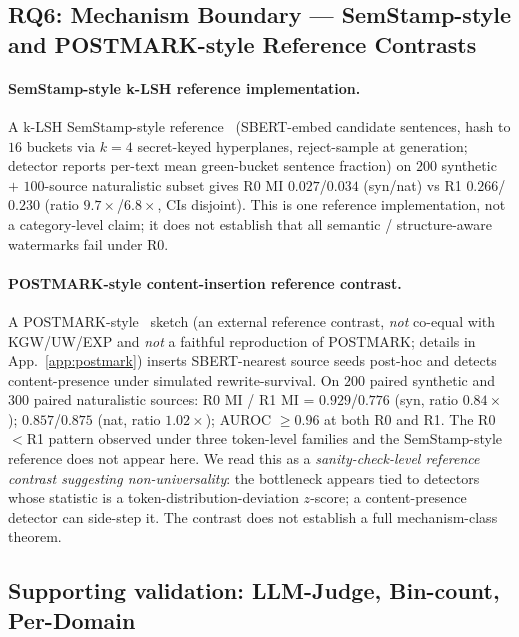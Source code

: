 \documentclass[11pt]{article}
\begin{document}
\subsection{RQ6: Mechanism Boundary --- SemStamp-style and POSTMARK-style Reference Contrasts}
\label{sec:semstamp_neg}

\paragraph{SemStamp-style k-LSH reference implementation.}
A k-LSH SemStamp-style reference~\citep{hou2024semstamp} (SBERT-embed
candidate sentences, hash to $16$ buckets via $k{=}4$ secret-keyed
hyperplanes, reject-sample at generation; detector reports per-text mean
green-bucket sentence fraction) on $200$ synthetic $+$ $100$-source
naturalistic subset gives R0 MI $0.027$/$0.034$ (syn/nat) vs R1
$0.266$/$0.230$ (ratio $9.7\times$/$6.8\times$, CIs disjoint). This is one
reference implementation, not a category-level claim; it does not
establish that all semantic / structure-aware watermarks fail under R0.

\paragraph{POSTMARK-style content-insertion reference contrast.}
\label{sec:postmark}
A POSTMARK-style~\citep{yoo2024postmark} sketch (an external reference
contrast, \emph{not} co-equal with KGW/UW/EXP and \emph{not} a faithful
reproduction of POSTMARK; details in App.~\ref{app:postmark}) inserts
SBERT-nearest source seeds post-hoc and detects content-presence under
simulated rewrite-survival. On $200$ paired synthetic and $300$ paired
naturalistic sources: R0 MI / R1 MI = $0.929$/$0.776$ (syn, ratio
$0.84\times$); $0.857$/$0.875$ (nat, ratio $1.02\times$); AUROC $\geq 0.96$
at both R0 and R1. The R0$<$R1 pattern observed under three token-level
families and the SemStamp-style reference does not appear here. We read
this as a \emph{sanity-check-level reference contrast suggesting
non-universality}: the bottleneck appears tied to detectors whose
statistic is a token-distribution-deviation $z$-score; a content-presence
detector can side-step it. The contrast does not establish a full
mechanism-class theorem.

\subsection{Supporting validation: LLM-Judge, Bin-count, Per-Domain}
\label{sec:judge}\label{sec:bin_sens}\label{sec:per_domain}
\end{document}
